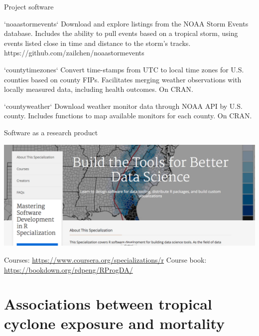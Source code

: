 \documentclass[ignorenonframetext,]{beamer}
\begin{document}
\begin{frame}{Project software}

\footnotesize

\begin{block}{`noaastormevents`}
Download and explore listings from the NOAA Storm Events database. Includes the ability to pull events based on a tropical storm, using events listed close in time and distance to the storm's tracks. 
https://github.com/zailchen/noaastormevents
\end{block}

\footnotesize

\begin{block}{`countytimezones`}
Convert time-stamps from UTC to local time zones for U.S. counties based on county FIPs. Facilitates merging weather observations with locally measured data, including health outcomes. On CRAN.
\end{block}

\footnotesize

\begin{block}{`countyweather`}
Download weather monitor data through NOAA API by U.S. county. Includes functions to map available monitors for each county. On CRAN.
\end{block}

\end{frame}

\begin{frame}{Software as a research product}

\includegraphics[width=\textwidth]{figures/coursera_screenshot}

Courses: \url{https://www.coursera.org/specializations/r} Course book:
\url{https://bookdown.org/rdpeng/RProgDA/}

\end{frame}

\section{Associations between tropical cyclone exposure and
mortality}\label{associations-between-tropical-cyclone-exposure-and-mortality}
\end{document}

